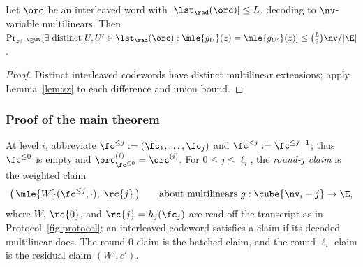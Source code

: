 \begin{lemma}\label{lem:ood}
Let $\orc$ be an interleaved word with $|\lst_\rad(\orc)| \le L$, decoding to $\nv$-variable multilinears. Then $\Pr_{z \leftarrow \E^{\nv}}[\exists \text{ distinct } U, U' \in \lst_\rad(\orc) : \mle{g_U}(z) = \mle{g_{U'}}(z)] \le \binom{L}{2} \nv / |\E|$.
\end{lemma}

\begin{proof}
Distinct interleaved codewords have distinct multilinear extensions; apply Lemma~\ref{lem:sz} to each difference and union bound.
\end{proof}

\subsubsection{Proof of the main theorem}\label{pcs:proof}

At level $i$, abbreviate $\fc^{\le j} := (\fc_1, \dots, \fc_j)$ and $\fc^{<j} := \fc^{\le j-1}$; thus $\fc^{\le 0}$ is empty and $\orc^{(i)}_{\fc^{\le 0}} = \orc^{(i)}$. For $0 \le j \le \ell_i$, the \emph{round-$j$ claim} is the weighted claim
\[
\bigl(\, \mle{W}(\fc^{\le j}, \cdot),\; \rc{j} \,\bigr) \qquad \text{about multilinears } g : \cube{\nv_i - j} \to \E,
\]
where $W$, $\rc{0}$, and $\rc{j} = h_j(\fc_j)$ are read off the transcript as in Protocol~\ref{fig:protocol}; an interleaved codeword satisfies a claim if its decoded multilinear does. The round-$0$ claim is the batched claim, and the round-$\ell_i$ claim is the residual claim $(W', c')$.

